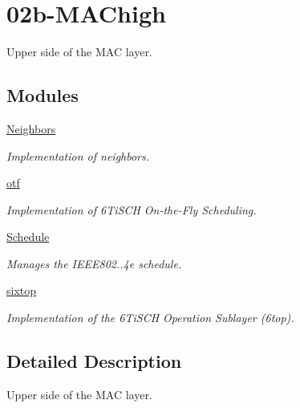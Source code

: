 \hypertarget{group___m_a_chigh}{}\section{02b-\/\+M\+A\+Chigh}
\label{group___m_a_chigh}


Upper side of the M\+AC layer.  


\subsection*{Modules}
\begin{DoxyCompactItemize}
\item 
\hyperlink{group___neighbors}{Neighbors}
\begin{DoxyCompactList}\small\item\em Implementation of neighbors. \end{DoxyCompactList}\item 
\hyperlink{group__otf}{otf}
\begin{DoxyCompactList}\small\item\em Implementation of 6\+Ti\+S\+CH On-\/the-\/\+Fly Scheduling. \end{DoxyCompactList}\item 
\hyperlink{group___schedule}{Schedule}
\begin{DoxyCompactList}\small\item\em Manages the I\+E\+E\+E802..\+4e schedule. \end{DoxyCompactList}\item 
\hyperlink{group__sixtop}{sixtop}
\begin{DoxyCompactList}\small\item\em Implementation of the 6\+Ti\+S\+CH Operation Sublayer (6top). \end{DoxyCompactList}\end{DoxyCompactItemize}


\subsection{Detailed Description}
Upper side of the M\+AC layer. 

